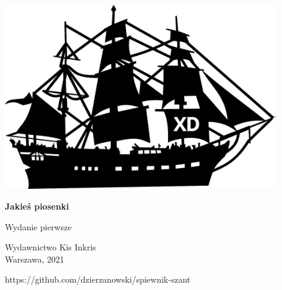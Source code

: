 \documentclass[11pt, twoside]{article}
\begin{document}
\begin{titlepage}
    \begin{center}
        \vspace*{5cm}
        
        \includegraphics[height=8cm]{images/front-obrazek.png}

        \vspace{1.5cm}

        \Huge\textbf{Jakieś piosenki}
        
        \vspace{0.5cm}
        
        \LARGE Wydanie pierwsze
        
        \vfill

        \Large
        Wydawnictwo Kis Inkris \\
        Warszawa, 2021

        \vspace{0.5cm}

        \footnotesize
        https://github.com/dzierzanowski/spiewnik-szant

    \end{center}
\end{titlepage}
\end{document}
